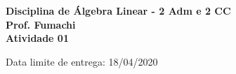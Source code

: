 \documentclass{article}
\begin{document}
\pagestyle{empty}






\begin{center}\textbf{\Large{Disciplina de Álgebra Linear - 2 Adm e 2 CC \\ Prof. Fumachi \\ \vspace{0.5cm} Atividade 01}}\end{center}
\begin{center}\large{Data limite de entrega: 18/04/2020}\end{center}
	
\end{document}
